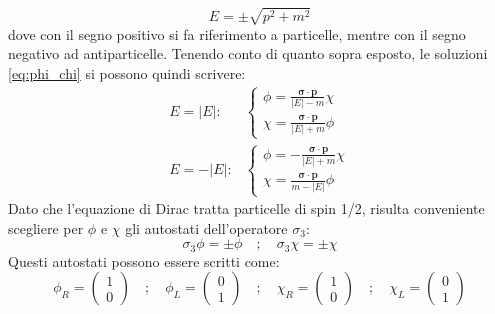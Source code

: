 \documentclass{subnucbo}
\begin{document}
                \begin{equation}
                        E = \pm \sqrt { p ^ { 2 } + m ^ { 2 } }
                \end{equation}
                dove con il segno positivo si fa riferimento a particelle, mentre con il segno negativo ad antiparticelle. Tenendo conto di quanto sopra esposto, le soluzioni \ref{eq:phi_chi} si possono quindi scrivere:
                \begin{subequations}
                        \begin{align}
                                E = | E | :  &
                                \begin{cases}
                                        \phi = \frac { \boldsymbol{\sigma} \cdot \boldsymbol{p}} { | E | - m } \chi \\
                                        \chi = \frac { \boldsymbol{\sigma} \cdot \boldsymbol{p} } { | E | + m } \phi
                                \end{cases} \\
                                E = - | E | :  &
                                \begin{cases}
                                        \phi = - \frac { \boldsymbol{\sigma} \cdot \boldsymbol{p} } { | E | + m } \chi \\
                                        \chi = \frac { \boldsymbol{\sigma} \cdot \boldsymbol{p} } { m - | E | } \phi
                                \end{cases}
                        \end{align}
                        \label{eq:phi_chi_energy}
                \end{subequations}
                Dato che l'equazione di Dirac tratta particelle di spin 1/2, risulta conveniente scegliere per $\phi$ e $\chi$ gli autostati dell'operatore $\sigma_{3}$:
                \begin{equation}
                        \sigma _ { 3 } \phi = \pm \phi \quad ; \quad \sigma _ { 3 } \chi = \pm \chi
                \end{equation}
                Questi autostati possono essere scritti come:
                \begin{equation}
                        \phi _ { R } = \left( \begin{array} { l } { 1 } \\ { 0 } \end{array} \right) \quad ; \quad \phi _ { L } = \left( \begin{array} { l } { 0 } \\ { 1 } \end{array} \right) \quad ; \quad \chi _ { R } = \left( \begin{array} { l } { 1 } \\ { 0 } \end{array} \right) \quad ; \quad \chi _ { L } = \left( \begin{array} { l } { 0 } \\ { 1 } \end{array} \right)
                        \label{eq:left_right}
                \end{equation}
\end{document}
